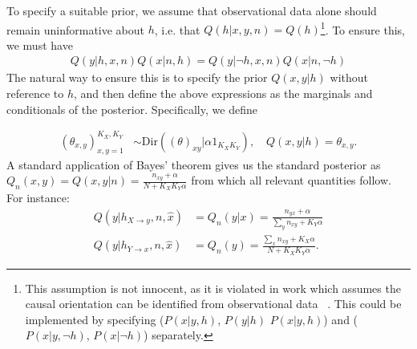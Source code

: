 \documentclass[letterpaper]{article} %
\begin{document}
To specify a suitable prior, we assume that observational data alone should remain uninformative about $h$, i.e. that $Q(h | x, y, n) = Q(h)$\footnote{This assumption is not innocent, as it is violated in work which assumes the causal orientation can be identified from observational data~ \cite{compton2021entropic}. This could be implemented by specifying ($P(x|y, h)$, $P(y|h)$ $P(x|y, h)$) and ($P(x|y, \neg h)$, $P(x|\neg h)$) separately.}. To ensure this, we must have
\begin{align}
Q(y | h, x, n)Q(x|n, h) = Q(y | \neg h, x, n)Q(x|n, \neg h)
\end{align}
The natural way to ensure this is to specify the prior $Q(x,y|h)$ without reference to $h$, and then define the above expressions as the marginals and conditionals of the posterior. Specifically, we define

\begin{align*}
(\theta_{x,y} )_{x,y=1}^{K_X,K_Y} & \sim \textrm{Dir}( (\theta)_{xy} | \alpha 1_{K_X K_Y} ), \quad
Q(x,y | h)  = \theta_{x,y}.
\end{align*}
A standard application of Bayes' theorem gives us the standard posterior as $Q_n(x,y) = Q(x,y|n) = \frac{n_{xy}+\alpha}{ N + K_X K_Y\alpha  }$ from which all relevant quantities follow. For instance:
\begin{subequations}\label{eq:6}
\begin{align}
Q(y | h_{X \rightarrow y}, n, \hat x) & = Q_n(y|x) = \frac{ n_{yx} +\alpha }{ \sum_{y} n_{xy} + K_Y \alpha } \\
Q(y | h_{Y \rightarrow x}, n, \hat x) & = Q_n(y) = \frac{ \sum_{x} n_{xy} + K_X \alpha }{ N + K_X K_Y \alpha }.
\end{align}
\end{subequations}
\end{document}
